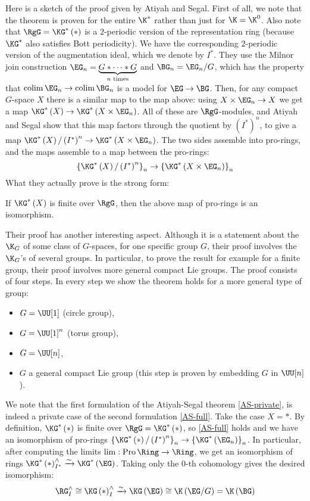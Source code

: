 Here is a sketch of the proof given by Atiyah and Segal.
First of all, we note that the theorem is proven for the entire $\K^*$ rather than just for $\K = \K^0$.
Also note that $\RgG = \KG^*\left(*\right)$ is a $2$-periodic version of the representation ring (because $\KG^*$ also satisfies Bott periodicity).
We have the corresponding $2$-periodic version of the augmentation ideal, which we denote by $I^*$.
They use the Milnor join construction $\EG_n = \underbrace{G * \cdots * G}_{n \text{ times}}$ and $\BG_n = \EG_n/G$, which has the property that $\colim \EG_n \to \colim \BG_n$ is a model for $\EG \to \BG$.
Then, for any compact $G$-space $X$ there is a similar map to the map above: using $X \times \EG_n \to X$ we get a map $\KG^*\left(X\right) \to \KG^*\left(X \times \EG_n\right)$.
All of these are $\RgG$-modules, and Atiyah and Segal show that this map factors through the quotient by $\left(I^*\right)^n$, to give a map $\KG^*\left(X\right)/\left(I^*\right)^n \to \KG^*\left(X \times \EG_n\right)$.
The two sides assemble into pro-rings, and the maps assemble to a map between the pro-rings:
$$
\left\{\KG^*\left(X\right)/\left(I^*\right)^n\right\}_n
\to \left\{\KG^*\left(X \times \EG_n\right)\right\}_n
$$
What they actually prove is the strong form:

\begin{theorem}[{\cite{AS}}]\label{AS-full}
	If $\KG^*\left(X\right)$ is finite over $\RgG$, then the above map of pro-rings is an isomorphism.
\end{theorem}

Their proof has another interesting aspect.
Although it is a statement about the $\K_G$ of some class of $G$-spaces, for one specific group $G$, their proof involves the $\K_G$'s of several groups.
In particular, to prove the result for example for a finite group, their proof involves more general compact Lie groups.
The proof consists of four steps.
In every step we show the theorem holds for a more general type of group:
\begin{itemize}
	\item $G = \UU[1]$ (circle group),
	\item $G = \UU[1]^n$ (torus group),
	\item $G = \UU[n]$,
	\item $G$ a general compact Lie group (this step is proven by embedding $G$ in $\UU[n]$).
\end{itemize}

We note that the first formulation of the Atiyah-Segal theorem \ref{AS-private}, is indeed a private case of the second formulation \ref{AS-full}.
Take the case $X = *$.
By definition, $\KG^*\left(*\right)$ is finite over $\RgG = \KG^*\left(*\right)$, so \ref{AS-full} holds and we have an isomorphism of pro-rings $\left\{\KG^*\left(*\right)/\left(I^*\right)^n\right\}_n \to \left\{\KG^*\left(\EG_n\right)\right\}_n$.
In particular, after computing the limits $\lim: \pro \Ring \to \Ring$, we get an isomorphism of rings $\KG^*\left(*\right)_{I^*}^\wedge \xrightarrow{\sim} \KG^*\left(\EG\right)$.
Taking only the $0$-th cohomology gives the desired isomorphism:
$$
\RG_I^\wedge
\cong \KG\left(*\right)_I^\wedge
\xrightarrow{\sim} \KG\left(\EG\right)
\cong \K\left(\EG/G\right)
= \K\left(\BG\right)
$$





